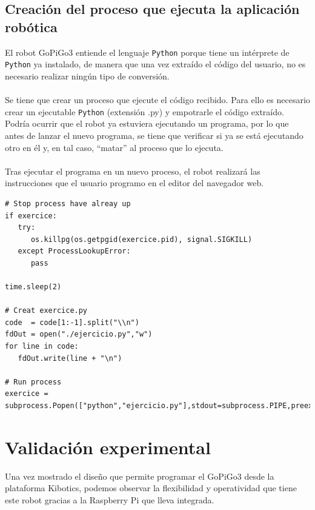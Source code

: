 \subsection{Creación del proceso que ejecuta la aplicación robótica}

El robot GoPiGo3 entiende el lenguaje \texttt{Python} porque tiene un intérprete de \texttt{Python} ya instalado, de manera que una vez extraído el código del usuario, no es necesario realizar ningún tipo de conversión.
\\
\\
Se tiene que crear un proceso que ejecute el código recibido. Para ello es necesario crear un ejecutable \texttt{Python} (extensión .py) y empotrarle el código extraído. Podría ocurrir que el robot ya estuviera ejecutando un programa, por lo que antes de lanzar el nuevo programa, se tiene que verificar si ya se está ejecutando otro en él y, en tal caso, “matar” al proceso que lo ejecuta.
\\
\\
Tras ejecutar el programa en un nuevo proceso, el robot realizará las instrucciones que el usuario programo en el editor del navegador web.
\\
\begin{lstlisting}[frame=single,breaklines=true, label=Creación del proceso con el programa para el robot, caption=Creación del proceso con el programa para el robot,  captionpos=b]
# Stop process have alreay up
if exercice:
   try:
      os.killpg(os.getpgid(exercice.pid), signal.SIGKILL)
   except ProcessLookupError:
      pass

time.sleep(2)
    
# Creat exercice.py
code  = code[1:-1].split("\\n")
fdOut = open("./ejercicio.py","w")
for line in code:
   fdOut.write(line + "\n")
    
# Run process
exercice = subprocess.Popen(["python","ejercicio.py"],stdout=subprocess.PIPE,preexec_fn=os.setsid)
\end{lstlisting}

\section{Validación experimental}

Una vez mostrado el diseño que permite programar el GoPiGo3 desde la plataforma Kibotics, podemos observar la flexibilidad y operatividad que tiene este robot gracias a la Raspberry Pi que lleva integrada.
\\
\\
